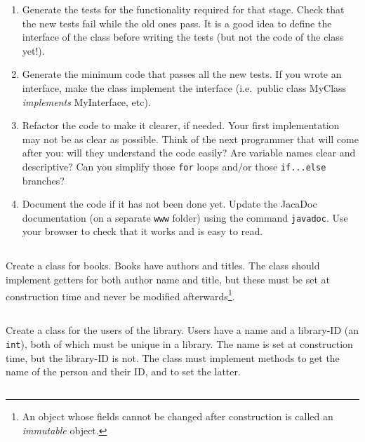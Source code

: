 \documentclass{article}
\begin{document}
\begin{enumerate}
\item Generate the tests for the functionality required for that
  stage. Check that the new tests fail while the old ones pass. It is
  a good idea to define the interface of the class before writing the
  tests (but not the code of the class yet!). 
\item Generate the minimum code that passes all the new tests. If you
  wrote an interface, make the class implement the interface
  (i.e.~public class MyClass \emph{implements} MyInterface, etc). 
\item Refactor the code to make it clearer, if needed. Your first
  implementation may not be as clear as possible. Think of the next
  programmer that will come after you: will they understand the code
  easily? Are variable names clear and descriptive? Can you simplify
  those \verb+for+ loops and/or those \verb+if...else+ branches?
\item Document the
  code if it has not been done yet. Update the JacaDoc documentation
  (on a separate \verb+www+ folder) using the command
  \verb+javadoc+. Use your browser to check that it works and is easy
  to read. 
\end{enumerate}

\subsection{}

Create a class for books. Books have authors and titles. The class
should implement getters for both author name and title, but these
must be set at construction time and never be modified
afterwards\footnote{An object whose fields cannot be changed after
  construction is called an \emph{immutable} object.}.

\subsection{}

Create a class for the users of the library. Users have a name and a
library-ID (an \verb+int+), 
both of which must be unique in a library. The name is
set at construction time, but the library-ID is not. 
The class must implement methods to get the
name of the person and their ID, and to set the latter. 

\subsection{}
\end{document}
